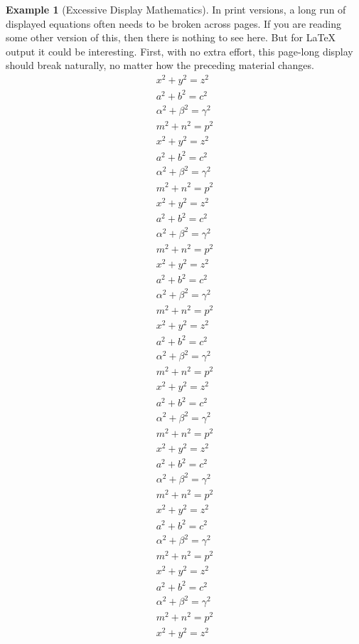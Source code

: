 \documentclass{amsart}
\theoremstyle{plain}%
\theoremstyle{definition}%
\newtheorem{example}[theorem]{Example}
\theoremstyle{remark}%
\numberwithin{equation}{section}
\begin{document}
\begin{example}[Excessive Display Mathematics]\label{section-mathematics-4-10}%
%
In print versions, a long run of displayed equations often needs to be broken across pages.  If you are reading some other version of this, then there is nothing to see here.  But for \LaTeX{} output it could be interesting.  First, with no extra effort, this page-long display should break naturally, no matter how the preceding material changes.%
\begin{gather*}
x^2+y^2=z^2\\
a^2+b^2=c^2\\
\alpha^2+\beta^2=\gamma^2\\
m^2+n^2=p^2\\
x^2+y^2=z^2\\
a^2+b^2=c^2\\
\alpha^2+\beta^2=\gamma^2\\
m^2+n^2=p^2\\
x^2+y^2=z^2\\
a^2+b^2=c^2\\
\alpha^2+\beta^2=\gamma^2\\
m^2+n^2=p^2\\
x^2+y^2=z^2\\
a^2+b^2=c^2\\
\alpha^2+\beta^2=\gamma^2\\
m^2+n^2=p^2\\
x^2+y^2=z^2\\
a^2+b^2=c^2\\
\alpha^2+\beta^2=\gamma^2\\
m^2+n^2=p^2\\
x^2+y^2=z^2\\
a^2+b^2=c^2\\
\alpha^2+\beta^2=\gamma^2\\
m^2+n^2=p^2\\
x^2+y^2=z^2\\
a^2+b^2=c^2\\
\alpha^2+\beta^2=\gamma^2\\
m^2+n^2=p^2\\
x^2+y^2=z^2\\
a^2+b^2=c^2\\
\alpha^2+\beta^2=\gamma^2\\
m^2+n^2=p^2\\
x^2+y^2=z^2\\
a^2+b^2=c^2\\
\alpha^2+\beta^2=\gamma^2\\
m^2+n^2=p^2\\
x^2+y^2=z^2\\

\end{gather*}
\end{example}
\end{document}
